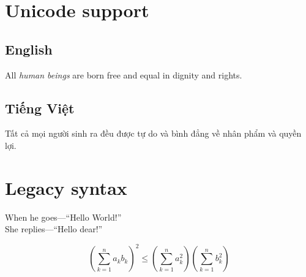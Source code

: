 \section{Unicode support}

\cite{default}

\subsection{English}
All \emph{human beings} are born free and equal in dignity and rights.
 
\subsection{Tiếng Việt}
Tất cả mọi người sinh ra đều được tự do và bình đẳng về nhân phẩm và 
quyền lợi.
 
\section{Legacy syntax}
When he goes---``Hello World!''\\
She replies—“Hello dear!”
 
$$\left( \sum_{k=1}^n a_k b_k \right)^2 \leq \left( \sum_{k=1}^n a_k^2 \right) \left( \sum_{k=1}^n b_k^2 \right)$$
